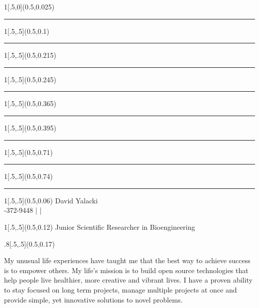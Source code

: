\documentclass{article}
\begin{document}
 \begin{titlepage} %
	 \begin{center}
 		\begin{textblock}{1}[.5,0](0.5,0.025) 
 			\rule{500pt}{1pt}
		\end{textblock}%
	 	\begin{textblock}{1}[.5,.5](0.5,0.1) 
 			\rule{500pt}{2pt}
 		\end{textblock}
		 \begin{textblock}{1}[.5,.5](0.5,0.215) 
 			\rule{500pt}{1pt}
 		\end{textblock}
		\begin{textblock}{1}[.5,.5](0.5,0.245) 
 			\rule{500pt}{2pt}
 		\end{textblock}
		 \begin{textblock}{1}[.5,.5](0.5,0.365) 
 			\rule{500pt}{1pt}
 		\end{textblock}
		\begin{textblock}{1}[.5,.5](0.5,0.395) 
 			\rule{500pt}{2pt}
 		\end{textblock}
		 \begin{textblock}{1}[.5,.5](0.5,0.71) 
 			\rule{500pt}{1pt}
 		\end{textblock}
		\begin{textblock}{1}[.5,.5](0.5,0.74) 
 			\rule{500pt}{2pt}
 		\end{textblock}
 
 	\begin{textblock}{1}[.5,.5](0.5,0.06) 
		\fontsize{28}{24}\selectfont
David Yalacki \\
{\fontsize{12}{1}-372-9448 | \href{mailto:david.yalacki@gmail.com}{\color{black}{david.yalacki@gmail.com}} | \href{http://www.linkedin.com/in/davidyalacki}{\color{black}{www.linkedin.com/in/davidyalacki}}}
		\end{textblock}
	\begin{textblock}{1}[.5,.5](0.5,0.12) 
		{\fontsize{18}{20}\selectfont
		Junior Scientific Researcher in Bioengineering} 
	\end{textblock}	
	\begin{textblock}{.8}[.5,.5](0.5,0.17) 
		\raggedright
		{\fontsize{12}{14}\bodyfont 
My unusual life experiences have taught me that the best way to achieve success is to empower others. My life's mission is to build open source technologies that help people live healthier, more creative and vibrant lives. I have a proven ability to stay focused on long term projects, manage multiple projects at once and provide simple, yet innovative solutions to novel problems. \\} %
	\end{textblock}
	

\end{center}
\end{titlepage}
\end{document}
